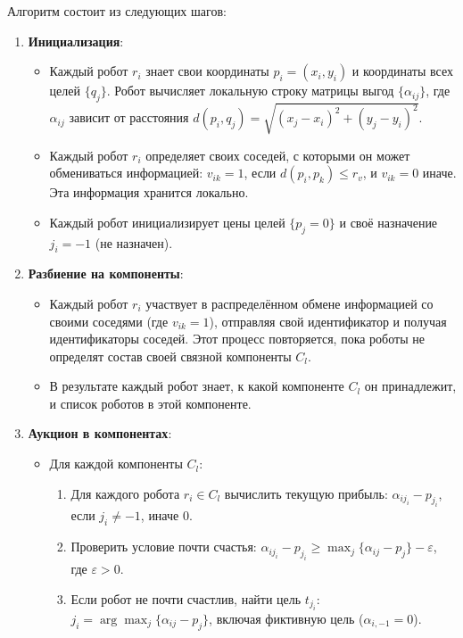 Алгоритм состоит из следующих шагов:
\begin{enumerate}
    \item \textbf{Инициализация}:
    \begin{itemize}
        \item Каждый робот \( r_i \) знает свои координаты \( p_i = (x_i, y_i) \) и координаты всех целей \( \{q_j\} \). Робот вычисляет локальную строку матрицы выгод \( \{\alpha_{ij}\} \), где \( \alpha_{ij} \) зависит от расстояния \( d(p_i, q_j) = \sqrt{(x_j - x_i)^2 + (y_j - y_i)^2} \).
        \item Каждый робот \( r_i \) определяет своих соседей, с которыми он может обмениваться информацией: \( v_{ik} = 1 \), если \( d(p_i, p_k) \leq r_v \), и \( v_{ik} = 0 \) иначе. Эта информация хранится локально.
        \item Каждый робот инициализирует цены целей \( \{p_j = 0\} \) и своё назначение \( j_i = -1 \) (не назначен).
    \end{itemize}
    \item \textbf{Разбиение на компоненты}:
    \begin{itemize}
        \item Каждый робот \( r_i \) участвует в распределённом обмене информацией со своими соседями (где \( v_{ik} = 1 \)), отправляя свой идентификатор и получая идентификаторы соседей. Этот процесс повторяется, пока роботы не определят состав своей связной компоненты \( C_l \).
        \item В результате каждый робот знает, к какой компоненте \( C_l \) он принадлежит, и список роботов в этой компоненте.
    \end{itemize}
    \item \textbf{Аукцион в компонентах}:
    \begin{itemize}
        \item Для каждой компоненты \( C_l \):
        \begin{enumerate}
            \item Для каждого робота \( r_i \in C_l \) вычислить текущую прибыль: \( \alpha_{i j_i} - p_{j_i} \), если \( j_i \neq -1 \), иначе \( 0 \).
            \item Проверить условие почти счастья: \( \alpha_{i j_i} - p_{j_i} \geq \max_j \{\alpha_{ij} - p_j\} - \varepsilon \), где \( \varepsilon > 0 \).
            \item Если робот не почти счастлив, найти цель \( t_{j_i} \): \( j_i = \arg \max_j \{\alpha_{ij} - p_j\} \), включая фиктивную цель (\( \alpha_{i,-1} = 0 \)).

\end{enumerate}
\end{itemize}
\end{enumerate}
